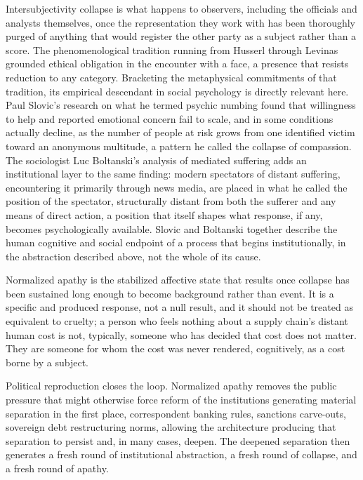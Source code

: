\documentclass[11pt]{article}
\begin{document}
Intersubjectivity collapse is what happens to observers, including the officials and analysts themselves, once the representation they work with has been thoroughly purged of anything that would register the other party as a subject rather than a score. The phenomenological tradition running from Husserl through Levinas grounded ethical obligation in the encounter with a face, a presence that resists reduction to any category. Bracketing the metaphysical commitments of that tradition, its empirical descendant in social psychology is directly relevant here. Paul Slovic's research on what he termed psychic numbing found that willingness to help and reported emotional concern fail to scale, and in some conditions actually decline, as the number of people at risk grows from one identified victim toward an anonymous multitude, a pattern he called the collapse of compassion. The sociologist Luc Boltanski's analysis of mediated suffering adds an institutional layer to the same finding: modern spectators of distant suffering, encountering it primarily through news media, are placed in what he called the position of the spectator, structurally distant from both the sufferer and any means of direct action, a position that itself shapes what response, if any, becomes psychologically available. Slovic and Boltanski together describe the human cognitive and social endpoint of a process that begins institutionally, in the abstraction described above, not the whole of its cause.

Normalized apathy is the stabilized affective state that results once collapse has been sustained long enough to become background rather than event. It is a specific and produced response, not a null result, and it should not be treated as equivalent to cruelty; a person who feels nothing about a supply chain's distant human cost is not, typically, someone who has decided that cost does not matter. They are someone for whom the cost was never rendered, cognitively, as a cost borne by a subject.

Political reproduction closes the loop. Normalized apathy removes the public pressure that might otherwise force reform of the institutions generating material separation in the first place, correspondent banking rules, sanctions carve-outs, sovereign debt restructuring norms, allowing the architecture producing that separation to persist and, in many cases, deepen. The deepened separation then generates a fresh round of institutional abstraction, a fresh round of collapse, and a fresh round of apathy.
\end{document}
